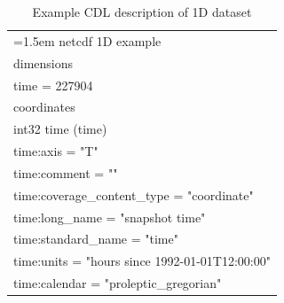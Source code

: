 \begin{longtable}{|p{\textwidth}|}
\caption{Example CDL description of 1D dataset}
\label{tab:cdl-1D} \\
\hline \endhead
\hline \endfoot
\hangindent=1.5em\hangafter=1
netcdf 1D example\\
dimensions\\
\hline
\rowcolor{YellowGreen}  time = 227904\\
\hline

coordinates\\
\hline
\rowcolor{Apricot}\hspace{0.5cm}int32 time (time)\\
\rowcolor{Apricot}\hspace{0.5cm}\hspace{0.5cm}time:axis = "T"\\
\rowcolor{Apricot}\hspace{0.5cm}\hspace{0.5cm}time:comment = ""\\
\rowcolor{Apricot}\hspace{0.5cm}\hspace{0.5cm}time:coverage\_content\_type = "coordinate"\\
\rowcolor{Apricot}\hspace{0.5cm}\hspace{0.5cm}time:long\_name = "snapshot time"\\
\rowcolor{Apricot}\hspace{0.5cm}\hspace{0.5cm}time:standard\_name = "time"\\
\rowcolor{Apricot}\hspace{0.5cm}\hspace{0.5cm}time:units = "hours since 1992-01-01T12:00:00"\\
\rowcolor{Apricot}\hspace{0.5cm}\hspace{0.5cm}time:calendar = "proleptic\_gregorian"\\
\hline


\end{longtable}
